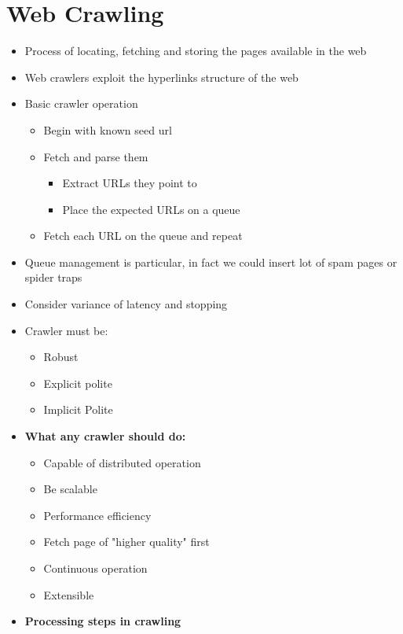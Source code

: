 \chapter{Web Crawling}
\begin{itemize}
    \item Process of locating, fetching and storing the pages available in the web
    \item Web crawlers exploit the hyperlinks structure of the web
    \item Basic crawler operation
    \begin{itemize}
        \item Begin with known seed url
        \item Fetch and parse them
        \begin{itemize}
            \item Extract URLs they point to
            \item Place the expected URLs on a queue
        \end{itemize}
        \item Fetch each URL on the queue and repeat
    \end{itemize}
    \item Queue management is particular, in fact we could insert lot of spam pages or spider traps 
    \item Consider variance of latency and stopping
    \item Crawler must be:
    \begin{itemize}
        \item Robust
        \item Explicit polite
        \item Implicit Polite
    \end{itemize}
    \item \textbf{What any crawler should do:}
    \begin{itemize}
        \item Capable of distributed operation
        \item Be scalable
        \item Performance efficiency
        \item Fetch page of "higher quality" first
        \item Continuous operation
        \item Extensible
    \end{itemize}
    \item \textbf{Processing steps in crawling}
    \begin{enumerate}

\end{enumerate}
\end{itemize}
